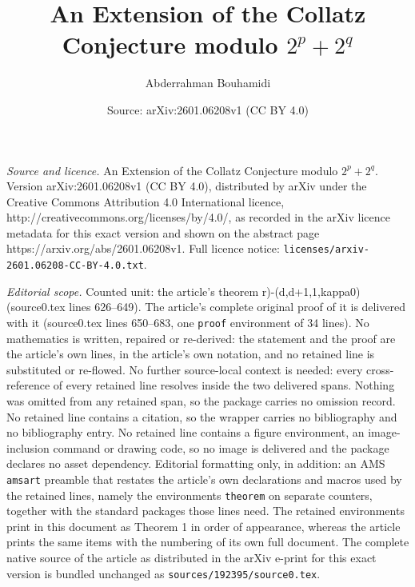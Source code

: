 \documentclass[10pt,a4paper]{amsart}
\title{An Extension of the Collatz Conjecture modulo $2^p+2^q$}
\author{Abderrahman Bouhamidi}
\date{Source: arXiv:2601.06208v1 (CC BY 4.0)}
\begin{document}
\maketitle

\noindent\emph{Source and licence.} An Extension of the Collatz Conjecture modulo $2^p+2^q$. Version arXiv:2601.06208v1 (CC BY 4.0), distributed by arXiv under the Creative Commons Attribution 4.0 International licence, http://creativecommons.org/licenses/by/4.0/, as recorded in the arXiv licence metadata for this exact version and shown on the abstract page https://arxiv.org/abs/2601.06208v1. Full licence notice: \texttt{licenses/arxiv-2601.06208-CC-BY-4.0.txt}.\par\smallskip

\noindent\textit{Editorial scope.} Counted unit: the article's theorem r)-(d,d+1,1,kappa0) (source0.tex lines 626--649). The article's complete original proof of it is delivered with it (source0.tex lines 650--683, one \texttt{proof} environment of 34 lines). No mathematics is written, repaired or re-derived: the statement and the proof are the article's own lines, in the article's own notation, and no retained line is substituted or re-flowed.  No further source-local context is needed: every cross-reference of every retained line resolves inside the two delivered spans.  Nothing was omitted from any retained span, so the package carries no omission record.  No retained line contains a citation, so the wrapper carries no bibliography and no bibliography entry.  No retained line contains a figure environment, an image-inclusion command or drawing code, so no image is delivered and the package declares no asset dependency.  Editorial formatting only, in addition: an AMS \texttt{amsart} preamble that restates the article's own declarations and macros used by the retained lines, namely the environments \texttt{theorem} on separate counters, together with the standard packages those lines need.  The retained environments print in this document as Theorem 1 in order of appearance, whereas the article prints the same items with the numbering of its own full document.  The complete native source of the article as distributed in the arXiv e-print for this exact version is bundled unchanged as \texttt{sources/192395/source0.tex}.
\end{document}
